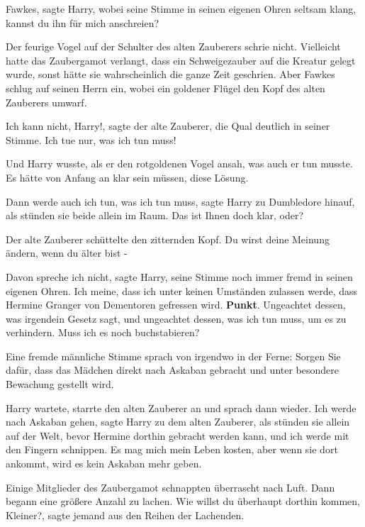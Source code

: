 \glqq{}Fawkes\grqq{}, sagte Harry, wobei seine Stimme in seinen eigenen Ohren
seltsam klang, \glqq{}kannst du ihn für mich anschreien?\grqq{}

Der feurige Vogel auf der Schulter des alten Zauberers schrie nicht. Vielleicht
hatte das Zaubergamot verlangt, dass ein Schweigezauber auf die Kreatur gelegt
wurde, sonst hätte sie wahrscheinlich die ganze Zeit geschrien. Aber Fawkes
schlug auf seinen Herrn ein, wobei ein goldener Flügel den Kopf des alten
Zauberers umwarf.

\glqq{}Ich kann nicht, Harry!\grqq{}, sagte der alte Zauberer, die Qual deutlich
in seiner Stimme. \glqq{}Ich tue nur, was ich tun muss!\grqq{}

Und Harry wusste, als er den rotgoldenen Vogel ansah, was auch er tun musste. Es
hätte von Anfang an klar sein müssen, diese Lösung.

\glqq{}Dann werde auch ich tun, was ich tun muss\grqq{}, sagte Harry zu
Dumbledore hinauf, als stünden sie beide allein im Raum. \glqq{}Das ist Ihnen
doch klar, oder?\grqq{}

Der alte Zauberer schüttelte den zitternden Kopf. \glqq{}Du wirst deine Meinung
ändern, wenn du älter bist -\grqq{}

\glqq{}Davon spreche ich nicht\grqq{}, sagte Harry, seine Stimme noch immer fremd
in seinen eigenen Ohren. \glqq{}Ich meine, dass ich unter keinen Umständen
zulassen werde, dass Hermine Granger von Dementoren gefressen wird.
\textbf{Punkt}. Ungeachtet dessen, was irgendein Gesetz sagt, und ungeachtet
dessen, was ich tun muss, um es zu verhindern. Muss ich es noch buchstabieren?\grqq{}

Eine fremde männliche Stimme sprach von irgendwo in der Ferne: \glqq{}Sorgen Sie
dafür, dass das Mädchen direkt nach Askaban gebracht und unter besondere
Bewachung gestellt wird.\grqq{}

Harry wartete, starrte den alten Zauberer an und sprach dann wieder. \glqq{}Ich
werde nach Askaban gehen\grqq{}, sagte Harry zu dem alten Zauberer, als stünden
sie allein auf der Welt, \glqq{}bevor Hermine dorthin gebracht werden kann, und
ich werde mit den Fingern schnippen. Es mag mich mein Leben kosten, aber wenn
sie dort ankommt, wird es kein Askaban mehr geben.\grqq{}

Einige Mitglieder des Zaubergamot schnappten überrascht nach Luft. Dann begann
eine größere Anzahl zu lachen. \glqq{}Wie willst du überhaupt dorthin kommen,
Kleiner?\grqq{}, sagte jemand aus den Reihen der Lachenden.


